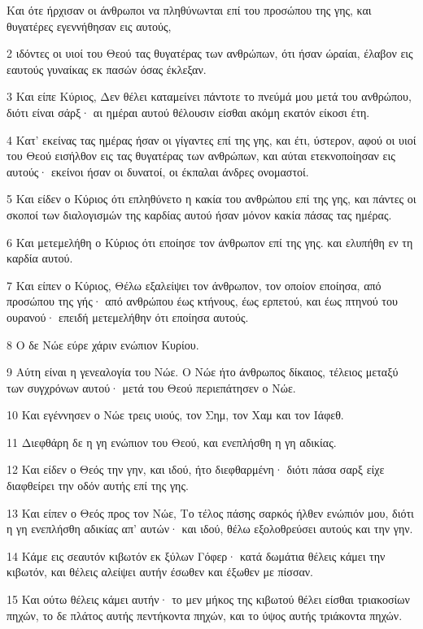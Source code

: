\par Και ότε ήρχισαν οι άνθρωποι να πληθύνωνται επί του προσώπου της γης, και θυγατέρες εγεννήθησαν εις αυτούς,
\par 2 ιδόντες οι υιοί του Θεού τας θυγατέρας των ανθρώπων, ότι ήσαν ώραίαι, έλαβον εις εαυτούς γυναίκας εκ πασών όσας έκλεξαν.
\par 3 Και είπε Κύριος, Δεν θέλει καταμείνει πάντοτε το πνεύμά μου μετά του ανθρώπου, διότι είναι σάρξ· αι ημέραι αυτού θέλουσιν είσθαι ακόμη εκατόν είκοσι έτη.
\par 4 Κατ' εκείνας τας ημέρας ήσαν οι γίγαντες επί της γης, και έτι, ύστερον, αφού οι υιοί του Θεού εισήλθον εις τας θυγατέρας των ανθρώπων, και αύται ετεκνοποίησαν εις αυτούς· εκείνοι ήσαν οι δυνατοί, οι έκπαλαι άνδρες ονομαστοί.
\par 5 Και είδεν ο Κύριος ότι επληθύνετο η κακία του ανθρώπου επί της γης, και πάντες οι σκοποί των διαλογισμών της καρδίας αυτού ήσαν μόνον κακία πάσας τας ημέρας.
\par 6 Και μετεμελήθη ο Κύριος ότι εποίησε τον άνθρωπον επί της γης. και ελυπήθη εν τη καρδία αυτού.
\par 7 Και είπεν ο Κύριος, Θέλω εξαλείψει τον άνθρωπον, τον οποίον εποίησα, από προσώπου της γής· από ανθρώπου έως κτήνους, έως ερπετού, και έως πτηνού του ουρανού· επειδή μετεμελήθην ότι εποίησα αυτούς.
\par 8 Ο δε Νώε εύρε χάριν ενώπιον Κυρίου.
\par 9 Αύτη είναι η γενεαλογία του Νώε. Ο Νώε ήτο άνθρωπος δίκαιος, τέλειος μεταξύ των συγχρόνων αυτού· μετά του Θεού περιεπάτησεν ο Νώε.
\par 10 Και εγέννησεν ο Νώε τρεις υιούς, τον Σημ, τον Χαμ και τον Ιάφεθ.
\par 11 Διεφθάρη δε η γη ενώπιον του Θεού, και ενεπλήσθη η γη αδικίας.
\par 12 Και είδεν ο Θεός την γην, και ιδού, ήτο διεφθαρμένη· διότι πάσα σαρξ είχε διαφθείρει την οδόν αυτής επί της γης.
\par 13 Και είπεν ο Θεός προς τον Νώε, Το τέλος πάσης σαρκός ήλθεν ενώπιόν μου, διότι η γη ενεπλήσθη αδικίας απ' αυτών· και ιδού, θέλω εξολοθρεύσει αυτούς και την γην.
\par 14 Κάμε εις σεαυτόν κιβωτόν εκ ξύλων Γόφερ· κατά δωμάτια θέλεις κάμει την κιβωτόν, και θέλεις αλείψει αυτήν έσωθεν και έξωθεν με πίσσαν.
\par 15 Και ούτω θέλεις κάμει αυτήν· το μεν μήκος της κιβωτού θέλει είσθαι τριακοσίων πηχών, το δε πλάτος αυτής πεντήκοντα πηχών, και το ύψος αυτής τριάκοντα πηχών.
